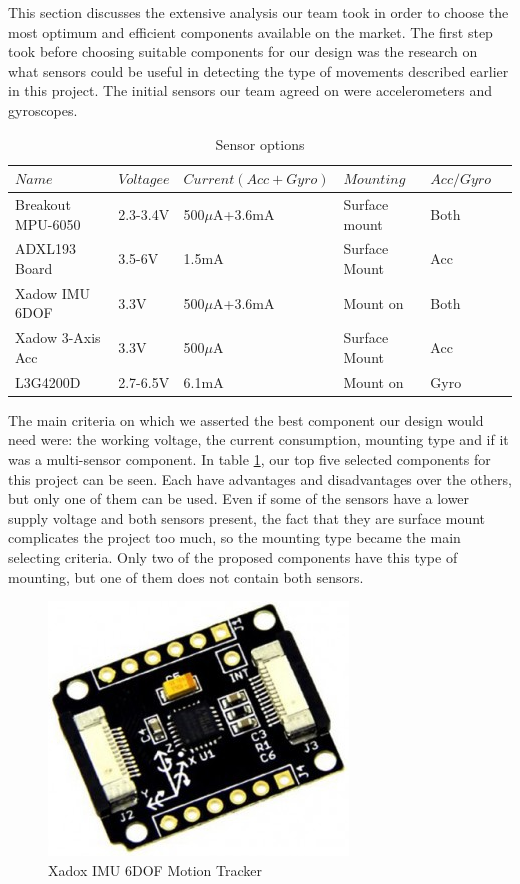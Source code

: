 This section discusses the extensive analysis our team took in order to choose the most optimum and efficient components available on the market. The first step took before choosing suitable components for our design was the research on what sensors could be useful in detecting the type of movements described earlier in this project. The initial sensors our team agreed on were accelerometers and gyroscopes.
\begin{table}[h]
	\centering
	\begin{tabular}{llllll}
		\hline
		$Name$ & $Voltagee$ & $Current(Acc+Gyro)$ & $Mounting$ & $Acc/Gyro$ \\
		\hline
		Breakout MPU-6050 & 2.3-3.4V & 500$\mu$A+3.6mA & Surface mount & Both\\
		\hline
		 ADXL193 Board & 3.5-6V & 1.5mA & Surface Mount & Acc \\
		\hline
		Xadow IMU 6DOF  & 3.3V &  500$\mu$A+3.6mA & Mount on & Both \\
		\hline
		Xadow 3-Axis Acc &  3.3V & 500$\mu$A & Surface Mount & Acc \\
		\hline
		 L3G4200D &  2.7-6.5V & 6.1mA & Mount on  & Gyro \\
		\hline
	\end{tabular}
	\caption{Sensor options}
	\label{table: componentsx}
\end{table}

The main criteria on which we asserted the best component our design would need were: the working voltage, the current consumption, mounting type and if it was a multi-sensor component. In table \ref{table: componentsx}, our top five selected components for this project can be seen. Each have advantages and disadvantages over the others, but only one of them can be used. Even if some of the sensors have a lower supply voltage and both sensors present, the fact that they are surface mount complicates the project too much, so the mounting type became the main selecting criteria. Only two of the proposed components have this type of mounting, but one of them does not contain both sensors.

\begin{figure}
\centering
\includegraphics[scale=0.4]{figures/Xadow_IMU_6DOF.PNG}
\caption{Xadox IMU 6DOF Motion Tracker \label{fig:xadox}}
\end{figure}



